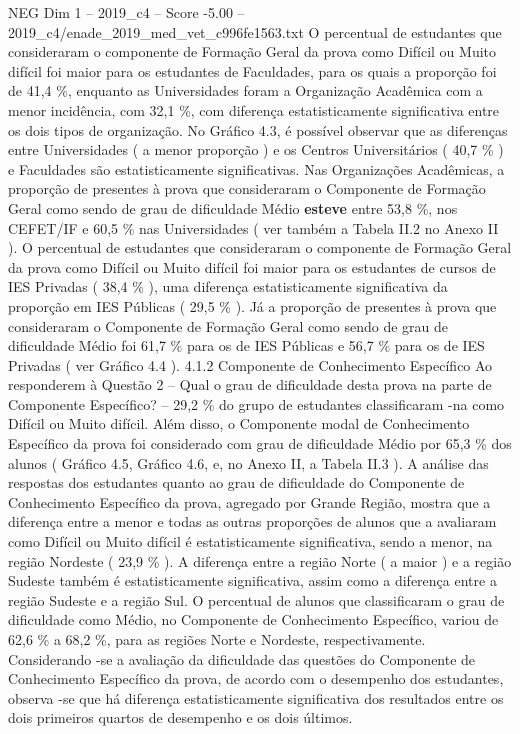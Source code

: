 \begin{textsample}{NEG Dim 1 – 2019\_c4 – Score -5.00 – 2019\_c4/enade\_2019\_med\_vet\_c996fe1563.txt}
O percentual de estudantes que consideraram o componente de Formação Geral da prova como Difícil ou Muito difícil foi maior para os estudantes de Faculdades, para os quais a proporção foi de 41,4 \%, enquanto as Universidades foram a Organização Acadêmica com a menor incidência, com 32,1 \%, com diferença estatisticamente significativa entre os dois tipos de organização.
No Gráfico 4.3, é possível observar que as diferenças entre Universidades ( a menor proporção ) e os Centros Universitários ( 40,7 \% ) e Faculdades são estatisticamente significativas.
Nas Organizações Acadêmicas, a proporção de presentes à prova que consideraram o Componente de Formação Geral como sendo de grau de dificuldade Médio \textbf{esteve} entre 53,8 \%, nos CEFET/IF e 60,5 \% nas Universidades ( ver também a Tabela II.2 no Anexo II ).
O percentual de estudantes que consideraram o componente de Formação Geral da prova como Difícil ou Muito difícil foi maior para os estudantes de cursos de IES Privadas ( 38,4 \% ), uma diferença estatisticamente significativa da proporção em IES Públicas ( 29,5 \% ).
Já a proporção de presentes à prova que consideraram o Componente de Formação Geral como sendo de grau de dificuldade Médio foi 61,7 \% para os de IES Públicas e 56,7 \% para os de IES Privadas ( ver Gráfico 4.4 ). 4.1.2 Componente de Conhecimento Específico Ao responderem à Questão 2 – Qual o grau de dificuldade desta prova na parte de Componente Específico? – 29,2 \% do grupo de estudantes classificaram -na como Difícil ou Muito difícil.
Além disso, o Componente modal de Conhecimento Específico da prova foi considerado com grau de dificuldade Médio por 65,3 \% dos alunos ( Gráfico 4.5, Gráfico 4.6, e, no Anexo II, a Tabela II.3 ).
A análise das respostas dos estudantes quanto ao grau de dificuldade do Componente de Conhecimento Específico da prova, agregado por Grande Região, mostra que a diferença entre a menor e todas as outras proporções de alunos que a avaliaram como Difícil ou Muito difícil é estatisticamente significativa, sendo a menor, na região Nordeste ( 23,9 \% ).
A diferença entre a região Norte ( a maior ) e a região Sudeste também é estatisticamente significativa, assim como a diferença entre a região Sudeste e a região Sul.
O percentual de alunos que classificaram o grau de dificuldade como Médio, no Componente de Conhecimento Específico, variou de 62,6 \% a 68,2 \%, para as regiões Norte e Nordeste, respectivamente.
Considerando -se a avaliação da dificuldade das questões do Componente de Conhecimento Específico da prova, de acordo com o desempenho dos estudantes, observa -se que há diferença estatisticamente significativa dos resultados entre os dois primeiros quartos de desempenho e os dois últimos.

\end{textsample}
